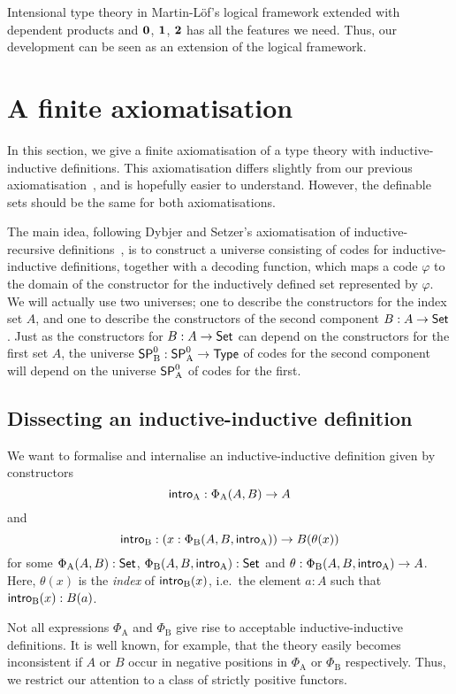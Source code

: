 \documentclass{article}
\begin{document}
Intensional type theory in Martin-L\"of's logical framework extended with
dependent products and $\mathbf{0}$, $\mathbf{1}$, $\mathbf{2}$
 has all the features we
need. Thus, our development can be seen as an extension of
the logical framework.

\section{A finite axiomatisation}
\label{sec:axiomatisation}
 

In this section, we give a finite axiomatisation of a type theory with
inductive-inductive definitions. This axiomatisation differs slightly
from our previous
axiomatisation~\cite{nordvallforsbergSetzer2010indind}, and is
hopefully easier to understand. However, the definable sets should
be the same for both axiomatisations.

The main idea, following Dybjer and Setzer's axiomatisation of
inductive-recursive definitions~\cite{dybjersetzer1999finax}, is to
construct a universe consisting of codes for inductive-inductive
definitions, together with a decoding function, which maps a code
$\varphi$ to the domain of the constructor for the inductively defined
set represented by $\varphi$.  We will actually use two universes; one
to describe the constructors for the index set $A$, and one to
describe the constructors of the second component $B : A \to \mathsf{Set}$.
Just as the constructors for $B : A \to \mathsf{Set}$ can depend on the
constructors for the first set $A$, the universe $\mathsf{SP}^{0}_{\mathrm{B}} : \mathsf{SP}^{0}_{\mathrm{A}} \to
\mathsf{Type}$ of codes for the second component will depend on the universe
$\mathsf{SP}^{0}_{\mathrm{A}}$ of codes for the first.

\subsection{Dissecting an inductive-inductive definition}
\label{sec:dissect-ind}

We want to formalise and internalise an inductive-inductive definition
given by constructors
\[
\mathsf{intro}_{\mathrm{A}} : \Phi_{\mathrm{A}}(A, B) \to A
\]
and
\[
\mathsf{intro}_{\mathrm{B}} : (x : \Phi_{\mathrm{B}}(A, B, \mathsf{intro}_{\mathrm{A}})) \to B(\theta(x))
\]
for some $\Phi_{\mathrm{A}}(A, B) : \mathsf{Set}$, $\Phi_{\mathrm{B}}(A, B,
\mathsf{intro}_{\mathrm{A}}) : \mathsf{Set}$ and $\theta : \Phi_{\mathrm{B}}(A, B, \mathsf{intro}_{\mathrm{A}}) \to
A$.
Here, $\theta(x)$ is the \emph{index} of $\mathsf{intro}_{\mathrm{B}}(x)$, i.e.\ the element $a :
A$ such that $\mathsf{intro}_{\mathrm{B}}(x) : B(a)$.

Not all expressions $\Phi_{\mathrm{A}}$ and $\Phi_{\mathrm{B}}$ give
rise to acceptable inductive-inductive definitions. It is well known,
for example, that the theory easily becomes inconsistent if $A$ or $B$ occur
in negative positions in $\Phi_{\mathrm{A}}$ or $\Phi_{\mathrm{B}}$
respectively. Thus, we restrict our attention to a class of strictly
positive functors.
\end{document}
